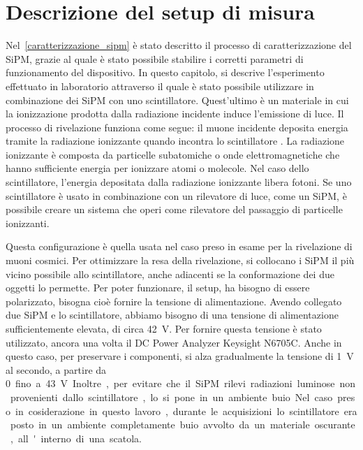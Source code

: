 \section{Descrizione del setup di misura}
Nel~\autoref*{caratterizzazione_sipm} è stato descritto il processo di caratterizzazione del SiPM, grazie al quale è stato possibile
stabilire i corretti parametri di funzionamento del dispositivo. In questo capitolo, si descrive l'esperimento effettuato in laboratorio
attraverso il quale è stato possibile utilizzare in combinazione dei SiPM con uno scintillatore. Quest'ultimo è un materiale
in cui la ionizzazione prodotta dalla radiazione incidente induce l'emissione di luce. Il processo di rivelazione funziona come segue: il muone
incidente deposita energia tramite la radiazione ionizzante quando incontra lo scintillatore \cite{yang_2022_mugrid} \cite{leoni_2021_scintillator}. La radiazione ionizzante è composta da particelle
subatomiche o onde elettromagnetiche che hanno sufficiente energia per ionizzare atomi o molecole. Nel caso dello scintillatore, l'energia
depositata dalla radiazione ionizzante libera fotoni. Se uno scintillatore è usato in combinazione con un rilevatore di luce, come un SiPM, è
possibile creare un sistema che operi come rilevatore del passaggio di particelle ionizzanti.

Questa configurazione è quella usata nel caso preso in esame per la rivelazione di muoni cosmici. Per ottimizzare la resa della rivelazione, si collocano i SiPM il più
vicino possibile allo scintillatore, anche adiacenti se la conformazione dei due oggetti lo permette. Per poter funzionare, il setup, ha
bisogno di essere polarizzato, bisogna cioè fornire la tensione di alimentazione. Avendo collegato due SiPM e lo scintillatore, abbiamo
bisogno di una tensione di alimentazione sufficientemente elevata, di circa \SI{42}{\volt}. Per fornire questa tensione è stato utilizzato,
ancora una volta il DC Power Analyzer Keysight N6705C. Anche in questo caso, per preservare i componenti, si alza
gradualmente la tensione di \SI{1}{\volt} al secondo, a partire da \SI{0} fino a \SI{43}{\volt}. Inoltre, per evitare che il SiPM rilevi
radiazioni luminose non provenienti dallo scintillatore, lo si pone in un ambiente buio. Nel caso preso in cosiderazione in questo lavoro,
durante le acquisizioni lo scintillatore era posto in un ambiente completamente buio avvolto da un materiale oscurante, all'interno di una scatola.

